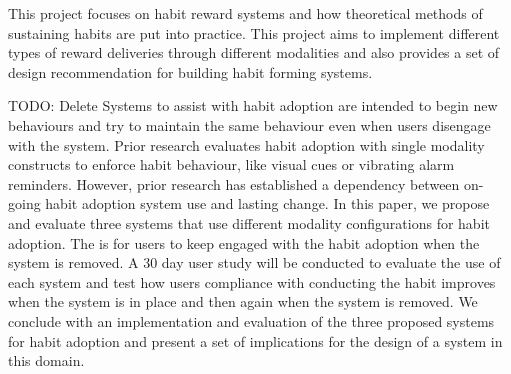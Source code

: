 This project focuses on habit reward systems and how theoretical methods of sustaining habits are put into practice. This project aims to implement different types of reward deliveries through different modalities and also provides a set of design recommendation for building habit forming systems.\newline

TODO: Delete
Systems to assist with habit adoption are intended to begin new behaviours and try to maintain the same behaviour even when users disengage with the system. Prior research evaluates habit adoption with single modality constructs to enforce habit behaviour, like visual cues or vibrating alarm reminders. However, prior research has established a dependency between on-going habit adoption system use and lasting change. In this paper, we propose and evaluate three systems that use different modality configurations for habit adoption. The is for users to keep engaged with the habit adoption when the system is removed. A 30 day user study will be conducted to evaluate the use of each system and test how users compliance with conducting the habit improves when the system is in place and then again when the system is removed. We conclude with an implementation and evaluation of the three proposed systems for habit adoption and present a set of implications for the design of a system in this domain.